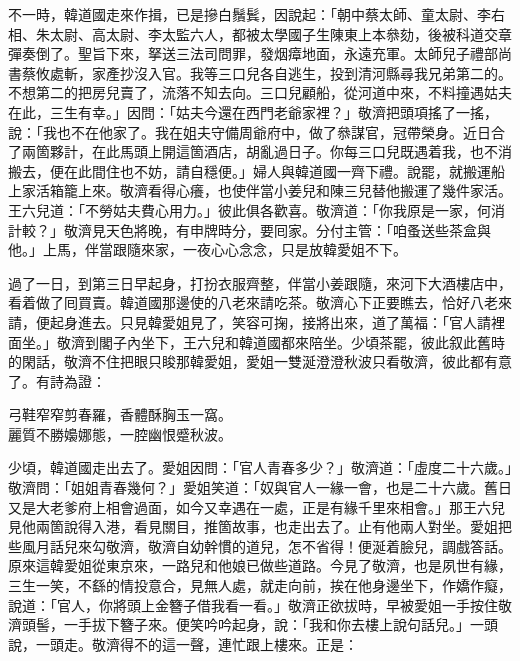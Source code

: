 不一時，韓道國走來作揖，已是摻白鬚鬂，{}因說起：「朝中蔡太師、童太尉、李右相、朱太尉、高太尉、李太監六人，都被太學國子生陳東上本叅劾，後被科道交章彈奏倒了。{}聖旨下來，拏送三法司問罪，發烟瘴地面，永遠充軍。太師兒子禮部尚書蔡攸處斬，家產抄沒入官。我等三口兒各自逃生，投到清河縣尋我兄弟第二的。不想第二的把房兒賣了，流落不知去向。三口兒顧船，從河道中來，不料撞遇姑夫在此，三生有幸。」因問：「姑夫今還在西門老爺家裡？」敬濟把頭項搖了一搖，說：「我也不在他家了。{}我在姐夫守備周爺府中，做了叅謀官，冠帶榮身。近日合了兩箇夥計，在此馬頭上開這箇酒店，胡亂過日子。你每三口兒既遇着我，也不消搬去，便在此間住也不妨，請自穩便。」婦人與韓道國一齊下禮。說罷，就搬運船上家活箱籠上來。敬濟看得心癢，也使伴當小姜兒和陳三兒替他搬運了幾件家活。{}王六兒道：「不勞姑夫費心用力。」彼此俱各歡喜。敬濟道：「你我原是一家，何消計較？」敬濟見天色將晚，有申牌時分，要囘家。分付主管：「咱蚤送些茶盒與他。」上馬，伴當跟隨來家，一夜心心念念，只是放韓愛姐不下。

過了一日，到第三日早起身，打扮衣服齊整，伴當小姜跟隨，來河下大酒樓店中，看着做了囘買賣。韓道國那邊使的八老來請吃茶。敬濟心下正要瞧去，恰好八老來請，便起身進去。只見韓愛姐見了，笑容可掬，{}接將出來，道了萬福：「官人請裡面坐。」敬濟到閣子內坐下，王六兒和韓道國都來陪坐。少頃茶罷，彼此叙此舊時的閑話，敬濟不住把眼只睃那韓愛姐，愛姐一雙涎澄澄秋波只看敬濟，{}彼此都有意了。有詩為證：

\begin{myquote}
弓鞋窄窄剪春羅，香體酥胸玉一窩。\\麗質不勝嬝娜態，一腔幽恨蹙秋波。
\end{myquote}

少頃，韓道國走出去了。愛姐因問：「官人青春多少？」敬濟道：「虛度二十六歲。」敬濟問：「姐姐青春幾何？」愛姐笑道：「奴與官人一緣一會，也是二十六歲。舊日又是大老爹府上相會過面，如今又幸遇在一處，正是有緣千里來相會。」{}那王六兒見他兩箇說得入港，看見關目，推箇故事，也走出去了。{}止有他兩人對坐。愛姐把些風月話兒來勾敬濟，敬濟自幼幹慣的道兒，怎不省得！便涎着臉兒，調戲答話。原來這韓愛姐從東京來，一路兒和他娘已做些道路。{}今見了敬濟，也是夙世有緣，三生一笑，不繇的情投意合，見無人處，就走向前，挨在他身邊坐下，作嬌作癡，說道：「官人，你將頭上金簪子借我看一看。」敬濟正欲拔時，早被愛姐一手按住敬濟頭髻，一手拔下簪子來。{}便笑吟吟起身，說：「我和你去樓上說句話兒。」一頭說，一頭走。敬濟得不的這一聲，連忙跟上樓來。正是：

